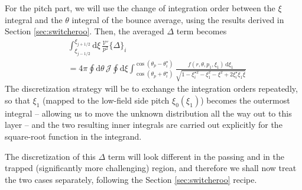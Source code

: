 \documentclass[11pt,a4paper]{article}
\newcommand{\rd}{\ensuremath{\mathrm{d}}}
\newcommand{\sub}[1]{\ensuremath{_{\text{#1}}}}
\newcommand{\Vp}{\ensuremath{\mathcal{V}'} }
\begin{document}

For the pitch part, we will use the change of integration order between the $\xi$ integral and the $\theta$ integral of the bounce average, using the results derived in Section \ref{sec:switcheroo}. 
Then, the averaged $\Delta$ term becomes
\begin{align}
&\int_{\xi_{j-1/2}}^{\xi_{j+1/2}} \rd \xi \,\frac{\mathcal{V}'}{p^2}\{\Delta\}_i \nonumber \\
&= 4\pi\oint\rd\theta \,\mathcal{J}\oint\rd\xi \int_{\cos(\theta_p+\theta_i^\star)}^{\cos(\theta_p-\theta_i^\star)} \frac{ f(r,\theta,p_1,\xi_1) \, \rd \xi_1}{\sqrt{1-\xi_i^{\star2} - \xi_1^2 - \xi^2 + 2\xi_i^\star\xi_1\xi}} 
\end{align}
The discretization strategy will be to exchange the integration orders repeatedly, so that $\xi_1$ (mapped to the low-field side pitch $\xi_0(\xi_1)$) becomes the outermost integral -- allowing us to move the unknown distribution all the way out to this layer -- and the two resulting inner integrals are carried out explicitly for the square-root function in the integrand.
 
The discretization of this $\Delta$ term will look different in the passing and in the trapped (significantly more challenging) region, and therefore we shall now treat the two cases separately, following the Section \ref{sec:switcheroo} recipe.
\end{document}
